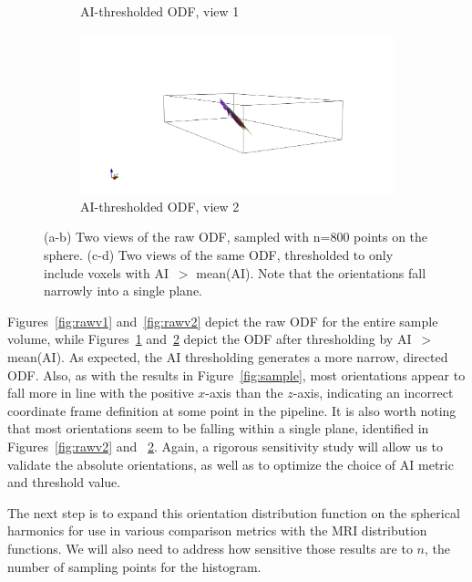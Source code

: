 \documentclass[11pt]{article}
\begin{document}
\begin{figure}[h]
\begin{subfigure}[b]{0.48\textwidth}
    \caption{AI-thresholded ODF, view 1\label{fig:maskedv1}}
  \end{subfigure}
  \hspace{1em}
  \begin{subfigure}[b]{0.48\textwidth}
    \centering \includegraphics[width=\textwidth]{../figs/ODF_masked_d2n7_view2}
    \caption{AI-thresholded ODF, view 2\label{fig:maskedv2}}
  \end{subfigure}
  \caption{(a-b) Two views of the raw ODF, sampled with n=800 points on the
    sphere. (c-d) Two views of the same ODF, thresholded to only include voxels
    with AI~$>$ mean(AI). Note that the orientations fall narrowly into a single
    plane.\label{fig:ODFs}}
\end{figure}
Figures~\ref{fig:rawv1} and~\ref{fig:rawv2} depict the raw ODF for the entire
sample volume, while Figures~\ref{fig:maskedv1} and~\ref{fig:maskedv2} depict
the ODF after thresholding by AI~$>$ mean(AI). As expected, the AI thresholding
generates a more narrow, directed ODF. Also, as with the results in
Figure~\ref{fig:sample}, most orientations appear to fall more in line with the
positive $x$-axis than the $z$-axis, indicating an incorrect coordinate frame
definition at some point in the pipeline. It is also worth noting that most
orientations seem to be falling within a single plane, identified in
Figures~\ref{fig:rawv2} and ~\ref{fig:maskedv2}. Again, a rigorous sensitivity
study will allow us to validate the absolute orientations, as well as to
optimize the choice of AI metric and threshold value.

The next step is to expand this orientation distribution function on the
spherical harmonics for use in various comparison metrics with the MRI
distribution functions. We will also need to address how sensitive those results
are to $n$, the number of sampling points for the histogram.
\end{document}
